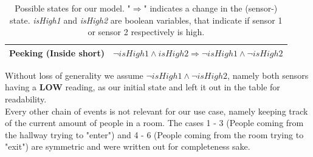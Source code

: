 \documentclass[]{article}
\begin{document}
\begin{sloppypar}
\begin{table}[H]
\begin{tabularx}{.9\textwidth}{| l | X |}
			\hline
			Peeking (Inside short) & $\neg \mathit{isHigh1} \wedge \mathit{isHigh2} \Longrightarrow \neg \mathit{isHigh1} \wedge \neg \mathit{isHigh2}$\\
			\hline
		\end{tabularx}
		\caption{Possible states for our model. "$\Longrightarrow$" indicates a change in the (sensor-) state. \textit{isHigh1} and \textit{isHigh2} are boolean variables, that indicate if sensor 1 or sensor 2 respectively is high.}
		\label{tab:possible_states}
\end{table}
Without loss of generality we assume $\neg \mathit{isHigh1} \wedge \neg \mathit{isHigh2}$, namely both sensors having a \textbf{LOW} reading, as our initial state and left it out in the table for readability.\\
Every other chain of events is not relevant for our use case, namely keeping track of the current amount of people in a room. The cases 1 - 3 (People coming from the hallway trying to "enter") and 4 - 6 (People coming from the room trying to "exit") are symmetric and were written out for completeness sake.\\
\newpage
\printbibliography

\end{sloppypar}
\end{document}
